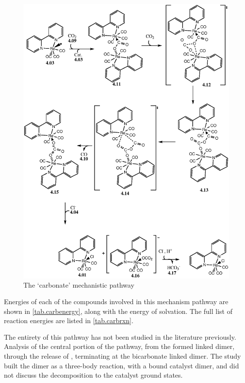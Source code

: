 \begin{figure}[!ht]
 \begin{center}
  \includegraphics[clip=true, width=140mm, keepaspectratio]{images/carbonate.eps}
 \end{center}
\caption{The `carbonate' mechanistic pathway}
\label{fig.carbonate}
\end{figure} 

Energies of each of the compounds involved in this mechanism pathway are shown in \autoref{tab.carbenergy}, along with the energy of solvation. The full list of reaction energies are listed in \autoref{tab.carbrxn}.




The entirety of this pathway has not been studied in the literature previously. Analysis of the central portion of the pathway, from the formed  linked dimer, through the release of , terminating at the bicarbonate linked dimer. The study built the dimer as a three-body reaction, with a  bound catalyst dimer, and did not discuss the decomposition to the catalyst ground states. 

